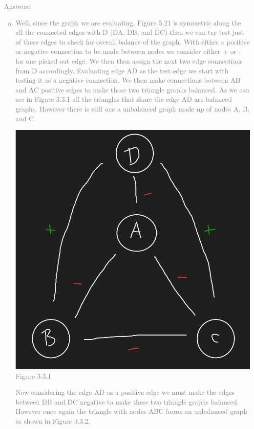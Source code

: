 \documentclass[11pt]{article}
\begin{document}
\textcolor{gray}{
Answers:
\begin{enumerate}[(a)]
	\item Well, since the graph we are evaluating, Figure 5.21 is symmetric along the all the connected edges with D (DA, DB, and DC) then we can try test just of these edges to check for overall balance of the graph.  With either a positive or negative connection to be made between nodes we consider either + or - for one picked out edge.  We then then assign the next two edge connections from D accordingly.  Evaluating edge AD as the test edge we start with testing it as a negative connection. We then make connections between AB and AC positive edges to make those two triangle graphs balanced. As we can see in Figure 3.3.1 all the triangles that share the edge AD are balanced graphs. However there is still one a unbalanced graph made up of nodes A, B, and C.\\
\begin{center}
	\includegraphics[scale=0.5]{Figure_3_3_1}\\
	Figure 3.3.1
\end{center}
Now considering the edge AD as a positive edge we must make the edges between DB and DC negative to make these two triangle graphs balanced.  However once again the triangle with nodes ABC forms an unbalanced graph as shown in Figure 3.3.2. \\

\end{enumerate}}
\end{document}
